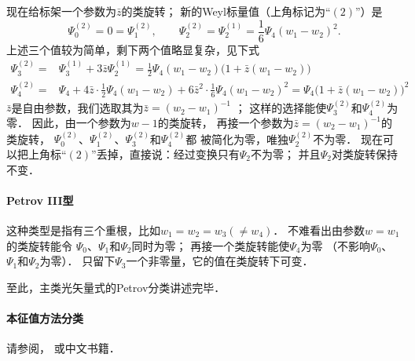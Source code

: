 现在给标架一个参数为$\bar{z}$的类旋转；
新的Weyl标量值（上角标记为“$(2)$”）是
\begin{equation}
    \Psi_0^{(2)}= 0=\Psi_1^{(2)},\qquad
    \Psi_2^{(2)}=\Psi_2^{(1)}=\frac{1}{6}\Psi_4 (w_1-w_2)^2 .
\end{equation}
上述三个值较为简单，剩下两个值略显复杂，见下式
\begin{align*}
        \Psi_3^{(2)}=&\Psi_3^{(1)}  +  3 \bar{z} \Psi_2^{(1)}
        =\frac{1}{2}\Psi_4 (w_1 - w_2)\bigl(1+\bar{z}(w_1 - w_2)\bigr) \\
        \Psi_4^{(2)}=& \Psi_4 + 4\bar{z}\cdot
        \frac{1}{2}\Psi_4 (w_1 - w_2) + 6\bar{z}^2 \cdot
        \frac{1}{6}\Psi_4 (w_1 - w_2)^2
        =\Psi_4 \bigl(1+ \bar{z}(w_1 - w_2)\bigr)^2
\end{align*} %
$\bar{z}$是自由参数，我们选取其为$\bar{z}= (w_2-w_1)^{-1}$ ；
这样的选择能使$\Psi_3^{(2)}$和$\Psi_4^{(2)}$为零．
因此，由一个参数为$w-1$的类旋转，
再接一个参数为$\bar{z}= (w_2-w_1)^{-1}$的类旋转，
$\Psi_0^{(2)}$、$\Psi_1^{(2)}$、$\Psi_3^{(2)}$和$\Psi_4^{(2)}$都
被简化为零，唯独$\Psi_2^{(2)}$不为零．
现在可以把上角标“$(2)$”丢掉，直接说：经过变换只有$\Psi_2$不为零；
并且$\Psi_2$对类旋转保持不变．



\paragraph{Petrov III型}
这种类型是指有三个重根，比如$w_1=w_2=w_3(\neq w_4)$．
不难看出由参数$w=w_1$的类旋转能令
$\Psi_0$、$\Psi_1$和$\Psi_2$同时为零；
再接一个类旋转能使$\Psi_4$为零
（不影响$\Psi_0$、$\Psi_1$和$\Psi_2$为零）．
只留下$\Psi_3$一个非零量，它的值在类旋转下可变．








至此，主类光矢量式的Petrov分类讲述完毕．





\paragraph{本征值方法分类}
请参阅\parencite[\S 4.1-4.2]{stephani-exe-2003}，
或中文书籍\parencite[附录\S 15.2]{chenbin2018}．



